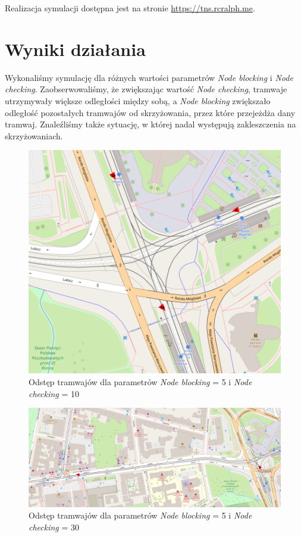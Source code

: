 \documentclass[12pt,a4paper]{article}
\begin{document}
        Realizacja symulacji dostępna jest na stronie \url{https://tns.rcralph.me}.

    \section{Wyniki działania}
        Wykonaliśmy symulację dla różnych wartości parametrów \textit{Node blocking} i \textit{Node checking}. Zaobserwowaliśmy, że zwiększając wartość \textit{Node checking}, tramwaje utrzymywały większe odległości między sobą, a \textit{Node blocking} zwiększało odległość pozostałych tramwajów od skrzyżowania, przez które przejeżdża dany tramwaj. Znaleźliśmy także sytuację, w której nadal występują zakleszczenia na skrzyżowaniach.

        \begin{figure}[H]
            \centering
            \includegraphics[width=\textwidth]{distance-5-10.png}
            \caption{Odstęp tramwajów dla parametrów \textit{Node blocking} = 5 i \textit{Node checking} = 10}
        \end{figure}

        \begin{figure}[H]
            \centering
            \includegraphics[width=\textwidth]{distance-5-30.png}
            \caption{Odstęp tramwajów dla parametrów \textit{Node blocking} = 5 i \textit{Node checking} = 30}
        \end{figure}
\end{document}
